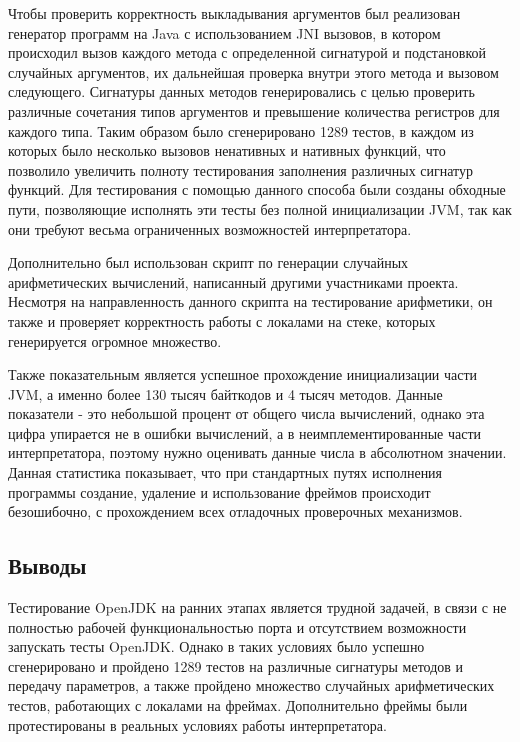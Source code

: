 Чтобы проверить корректность выкладывания аргументов был реализован генератор программ на Java с использованием JNI вызовов, в котором происходил вызов каждого метода с определенной сигнатурой и подстановкой случайных аргументов, их дальнейшая проверка внутри этого метода и вызовом следующего. Сигнатуры данных методов генерировались с целью проверить различные сочетания типов аргументов и превышение количества регистров для каждого типа. Таким образом было сгенерировано 1289 тестов, в каждом из которых было несколько вызовов ненативных и нативных функций, что позволило увеличить полноту тестирования заполнения различных сигнатур функций. Для тестирования с помощью данного способа были созданы обходные пути, позволяющие исполнять эти тесты без полной инициализации JVM, так как они требуют весьма ограниченных возможностей интерпретатора.

Дополнительно был использован скрипт по генерации случайных арифметических вычислений, написанный другими участниками проекта. Несмотря на направленность данного скрипта на тестирование арифметики, он также и проверяет корректность работы с локалами на стеке, которых генерируется огромное множество.

Также показательным является успешное прохождение инициализации части JVM, а именно более 130 тысяч байткодов и 4 тысяч методов. Данные показатели - это небольшой процент от общего числа вычислений, однако эта цифра упирается не в ошибки вычислений, а в неимплементированные части интерпретатора, поэтому нужно оценивать данные числа в абсолютном значении. Данная статистика показывает, что при стандартных путях исполнения программы создание, удаление и использование фреймов происходит безошибочно, с прохождением всех отладочных проверочных механизмов.



\subsection{Выводы}

Тестирование OpenJDK на ранних этапах является трудной задачей, в связи с не полностью рабочей функциональностью порта и отсутствием возможности запускать тесты OpenJDK. Однако в таких условиях было успешно сгенерировано и пройдено 1289 тестов на различные сигнатуры методов и передачу параметров, а также пройдено множество случайных арифметических тестов, работающих с локалами на фреймах. Дополнительно фреймы были протестированы в реальных условиях работы интерпретатора.



